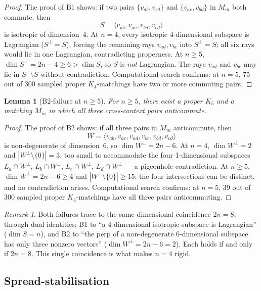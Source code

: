 \documentclass[11pt,a4paper]{article}
\theoremstyle{plain}
\newtheorem{lemma}[theorem]{Lemma}
\theoremstyle{definition}
\theoremstyle{remark}
\newtheorem*{remark}{Remark}
\begin{document}
\begin{proof}
The proof of B1 shows: if two pairs $\{v_{ab},v_{cd}\}$ and
$\{v_{ac},v_{bd}\}$ in $M_m$ both commute, then
\[
  S = \langle v_{ab}, v_{ac}, v_{bd}, v_{cd} \rangle
\]
is isotropic of dimension~4.
At $n = 4$, every isotropic 4-dimensional subspace is Lagrangian
($S^\perp = S$), forcing the remaining rays $v_{ad}, v_{bc}$
into $S^\perp = S$; all six rays would lie in one Lagrangian,
contradicting properness.
At $n \geq 5$, $\dim S^\perp = 2n - 4 \geq 6 > \dim S$,
so $S$ is \emph{not} Lagrangian.
The rays $v_{ad}$ and $v_{bc}$ may lie in
$S^\perp \setminus S$ without contradiction.
Computational search confirms: at $n = 5$, 75 out of 300 sampled
proper $K_4$-matchings have two or more commuting pairs.
\end{proof}

\begin{lemma}[B2-failure at $n \geq 5$]\label{lem:B2fail}
For $n \geq 5$, there exist a proper $K_5$ and a matching $M_m$ in which
all three cross-context pairs anticommute.
\end{lemma}

\begin{proof}
The proof of B2 shows: if all three pairs in $M_m$ anticommute, then
\[
  W = \langle v_{ab}, v_{ac}, v_{ad}, v_{bc}, v_{bd}, v_{cd} \rangle
\]
is non-degenerate of dimension~6, so $\dim W^\perp = 2n - 6$.
At $n = 4$, $\dim W^\perp = 2$ and $|W^\perp \setminus \{0\}| = 3$,
too small to accommodate the four 1-dimensional subspaces
$L_a \cap W^\perp$, $L_b \cap W^\perp$, $L_c \cap W^\perp$,
$L_d \cap W^\perp$ — a pigeonhole contradiction.
At $n \geq 5$, $\dim W^\perp = 2n - 6 \geq 4$ and
$|W^\perp \setminus \{0\}| \geq 15$;
the four intersections can be distinct, and no contradiction arises.
Computational search confirms: at $n = 5$, 39 out of 300 sampled
proper $K_4$-matchings have all three pairs anticommuting.
\end{proof}

\begin{remark}
Both failures trace to the same dimensional coincidence $2n = 8$, through dual
identities: B1 to ``a 4-dimensional isotropic subspace is Lagrangian''
($\dim S = n$), and B2 to ``the perp of a non-degenerate 6-dimensional subspace
has only three nonzero vectors'' ($\dim W^\perp = 2n-6 = 2$). Each holds if and
only if $2n = 8$. This single coincidence is what makes $n = 4$ rigid.
\end{remark}

\subsection{Spread-stabilisation}
\end{document}
